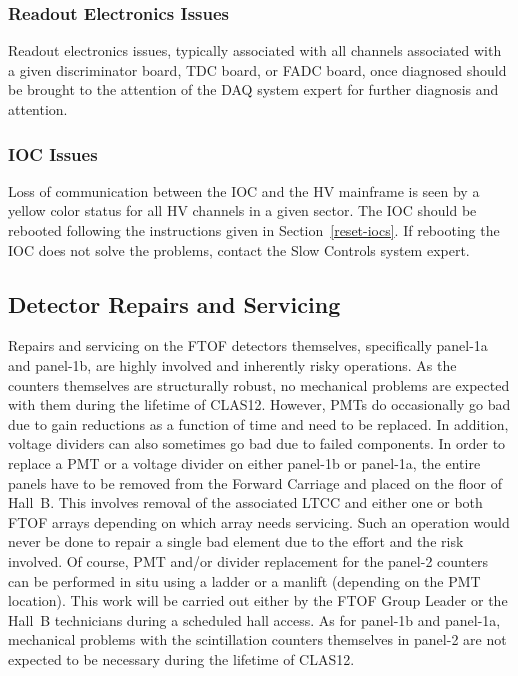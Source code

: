 \documentclass[12pt]{article}
\begin{document}
\subsubsection{Readout Electronics Issues}
\label{readout-issues}

Readout electronics issues, typically associated with all channels associated with a given
discriminator board, TDC board, or FADC board, once diagnosed should be brought to the
attention of the DAQ system expert for further diagnosis and attention.

\subsubsection{IOC Issues}
\label{ioc-issues}

Loss of communication between the IOC and the HV mainframe is seen by a yellow color status for
all HV channels in a given sector. The IOC should be rebooted following the instructions given 
in Section~\ref{reset-iocs}. If rebooting the IOC does not solve the problems, contact the 
Slow Controls system expert.

\subsection{Detector Repairs and Servicing}

Repairs and servicing on the FTOF detectors themselves, specifically panel-1a and panel-1b, are 
highly involved and inherently risky operations. As the counters themselves are structurally robust, 
no mechanical problems are expected with them during the lifetime of CLAS12. However, PMTs do 
occasionally go bad due to gain reductions as a function of time and need to be replaced. In addition, 
voltage dividers can also sometimes go bad due to failed components. In order to replace a PMT or a 
voltage divider on either panel-1b or panel-1a, the entire panels have to be removed from the Forward 
Carriage and placed on the floor of Hall~B. This involves removal of the associated LTCC and either 
one or both FTOF arrays depending on which array needs servicing. Such an operation would never be 
done to repair a single bad element due to the effort and the risk involved. Of course, PMT and/or 
divider replacement for the panel-2 counters can be performed in situ using a ladder or a manlift 
(depending on the PMT location). This work will be carried out either by the FTOF Group Leader or 
the Hall~B technicians during a scheduled hall access. As for panel-1b and panel-1a, mechanical 
problems with the scintillation counters themselves in panel-2 are not expected to be necessary 
during the lifetime of CLAS12.
\end{document}
